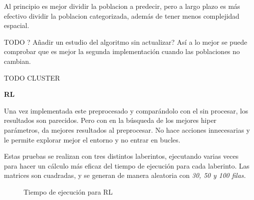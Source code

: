 Al principio es mejor dividir la poblacion a predecir, pero a largo plazo es más efectivo dividir la poblacion categorizada, además de tener menos complejidad espacial.




\vspace{1cm}

\color{blue} TODO ? Añadir un estudio del algoritmo sin actualizar? Así a lo mejor se puede comprobar que es mejor la segunda implementación cuando las poblaciones no cambian.

TODO CLUSTER
\color{black}

\newpage



\textbf{RL}

Una vez implementada este preprocesado y comparándolo con el sin procesar, los resultados son parecidos. Pero con en la búsqueda de los mejores hiper parámetros, da mejores resultados al preprocesar. No hace acciones innecesarias y le permite explorar mejor el entorno y no entrar en bucles.

Estas pruebas se realizan con tres distintos laberintos, ejecutando varias veces para hacer un cálculo más eficaz del tiempo de ejecución para cada laberinto. Las matrices son cuadradas, y se generan de manera aleatoria con \textit{30, 50 y 100 filas.}

\begin{figure}[!h]
	\centering
	\caption{Tiempo de ejecución para RL}
\end{figure}


